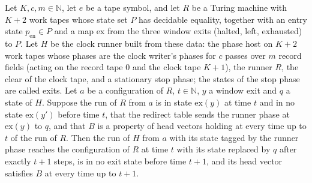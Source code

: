 \begin{lemma}
\label{Turing.cw_seg_run}
\leanok
{}
Let $K,c,m\in\mathbb{N}$, let $e$ be a tape symbol, and let $R$ be a Turing machine with $K+2$
work tapes whose state set $P$ has decidable equality, together with an entry state
$p_{\mathrm{en}}\in P$ and a map $\mathrm{ex}$ from the three window exits (halted, left,
exhausted) to $P$. Let $H$ be the clock runner built from these data: the phase host on $K+2$
work tapes whose phases are the clock writer's phases for $c$ passes over $m$ record fields
(acting on the record tape $0$ and the clock tape $K+1$), the runner $R$, the clear of the
clock tape, and a stationary stop phase; the states of the stop phase are called exits. Let $a$
be a configuration of $R$, $t\in\mathbb{N}$, $y$ a window exit and $q$ a state of $H$. Suppose
the run of $R$ from $a$ is in state $\mathrm{ex}(y)$ at time $t$ and in no state
$\mathrm{ex}(y')$ before time $t$, that the redirect table sends the runner phase at
$\mathrm{ex}(y)$ to $q$, and that $B$ is a property of head vectors holding at every time up to
$t$ of the run of $R$. Then the run of $H$ from $a$ with its state tagged by the runner phase
reaches the configuration of $R$ at time $t$ with its state replaced by $q$ after exactly $t+1$
steps, is in no exit state before time $t+1$, and its head vector satisfies $B$ at every time
up to $t+1$.
\end{lemma}

